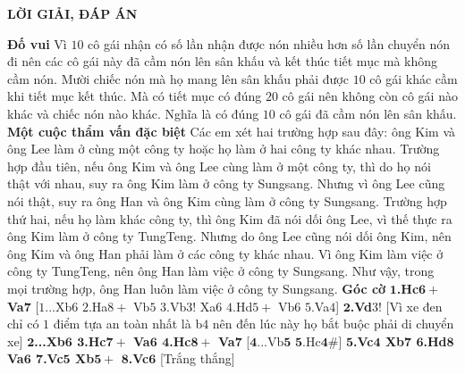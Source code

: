 \vspace*{10pt}
\centerline{\textbf{\LARGE\color{timhieukhoahoc}LỜI GIẢI, ĐÁP ÁN}}
\vskip 0.1cm
\begin{multicols}{2}
	\textbf{\color{timhieukhoahoc}Đố vui} 
	\vskip 0.1cm
	Vì $10$ cô gái nhận có số lần nhận được nón nhiều hơn số lần chuyển nón đi nên các cô gái này đã cầm nón lên sân khấu và kết thúc tiết mục mà không cầm nón. Mười chiếc nón mà họ mang lên sân khấu phải được $10$ cô gái khác cầm khi tiết mục kết thúc. Mà có tiết mục có đúng $20$ cô gái nên không còn cô gái nào khác và chiếc nón nào khác. Nghĩa là có đúng $10$ cô gái đã cầm nón lên sân khấu. 
	\vskip 0.1cm
	\textbf{\color{timhieukhoahoc}Một cuộc thẩm vấn đặc biệt}
	\vskip 0.1cm
	Các em xét hai trường hợp sau đây: ông Kim và ông Lee làm ở cùng một công ty hoặc họ làm ở hai công ty khác nhau.
	\vskip 0.1cm
	Trường hợp đầu tiên, nếu ông Kim và ông Lee cùng làm ở một công ty, thì do họ nói thật với nhau, suy ra ông Kim làm ở công ty Sungsang. Nhưng vì ông Lee cũng nói thật, suy ra ông Han và ông Kim cùng làm ở công ty Sungsang.
	\vskip 0.1cm
	Trường hợp thứ hai, nếu họ làm khác công ty, thì ông Kim đã nói dối ông Lee, vì thế thực ra ông Kim làm ở công ty TungTeng. Nhưng do ông Lee cũng nói dối ông Kim, nên ông Kim và ông Han phải làm ở các công ty khác nhau. Vì ông Kim làm việc ở công ty TungTeng, nên ông Han làm việc ở công ty Sungsang.
	\vskip 0.1cm
	Như vậy, trong mọi trường hợp, ông Han luôn làm việc ở công ty Sungsang.
	\vskip 0.1cm
	\textbf{\color{timhieukhoahoc}Góc cờ}
	\vskip 0.1cm
	$\pmb{1}$\textbf{\color{timhieukhoahoc}.Hc$\pmb{6+}$ Va}$\pmb{7}$ [$1$...Xb$6$ $2$.Ha$8+$ Vb$5$ $3$.Vb$3!$ Xa$6$ $4$.Hd$5+$ Vb$6$ $5$.Va$4$]
	\vskip 0.1cm
	$\pmb{2}$\textbf{\color{timhieukhoahoc}.Vd}$3$! [Vì xe đen chỉ có $1$ điểm tựa an toàn nhất là b$4$ nên đến lúc này họ bắt buộc phải di chuyển xe]
	\vskip 0.1cm
	$\pmb{2}$\textbf{\color{timhieukhoahoc}...Xb$\pmb{6}$ $\pmb{3}$.Hc$\pmb{7+}$ Va$\pmb{6}$ $\pmb{4}$.Hc$\pmb{8+}$ Va}$\pmb{7}$ [$\pmb{4}$...Vb$\pmb{5}$ $\pmb{5}$.Hc$\pmb{4\#}$]
	\vskip 0.1cm
	$\pmb{5}$\textbf{\color{timhieukhoahoc}.Vc$\pmb{4}$ Xb$\pmb{7}$ $\pmb{6}$.Hd$\pmb{8}$ Va$\pmb{6}$ $\pmb{7}$.Vc$\pmb{5}$ Xb$\pmb{5+}$ $\pmb{8}$.Vc}$\pmb{6}$ [Trắng thắng]
\end{multicols}


